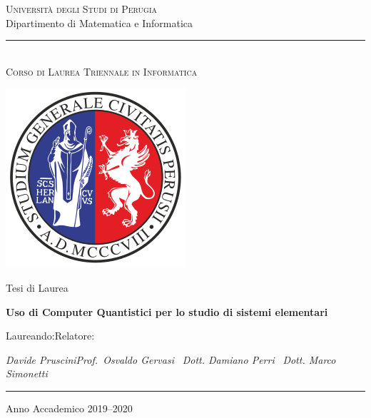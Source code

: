 \documentclass[a4paper,12pt]{report}
\title{\begin{large}\textbf{\titolotesi}\end{large}}
\author{\laureando}
\def\titolotesi{Uso di Computer Quantistici per lo studio di sistemi elementari}
\def\laureando{Davide Pruscini}
\def\annoaccademico{2019--2020}
\begin{document}
\begin{titlepage}

\begin{center}
\textsc{\Large Università degli Studi di Perugia}\medskip\\

{\Large Dipartimento di Matematica e Informatica}\medskip\\

\rule{10mm}{0.01mm}\medskip\\

{\small \textsc{Corso di Laurea Triennale in Informatica}}\medskip\\

\vspace*{3mm}

\includegraphics[scale=0.70]{LogoUniPG.png}

\Large Tesi di Laurea \par\bigskip

{\large \bf \titolotesi \par}

\end{center}\par

\hspace{0.05cm}Laureando:\hspace{7.3cm}Relatore:\par

\hspace{0.0cm}\emph{\laureando}\hfill\emph{Prof.~Osvaldo Gervasi}
\hspace*{7cm}\ \hfill \emph{Dott. Damiano Perri}
\hspace*{7cm}\ \hfill \emph{Dott. Marco Simonetti}
\vfill

\begin{center}

\rule{40mm}{0.01mm}

Anno Accademico \annoaccademico

\end{center}

\end{titlepage}
\end{document}
